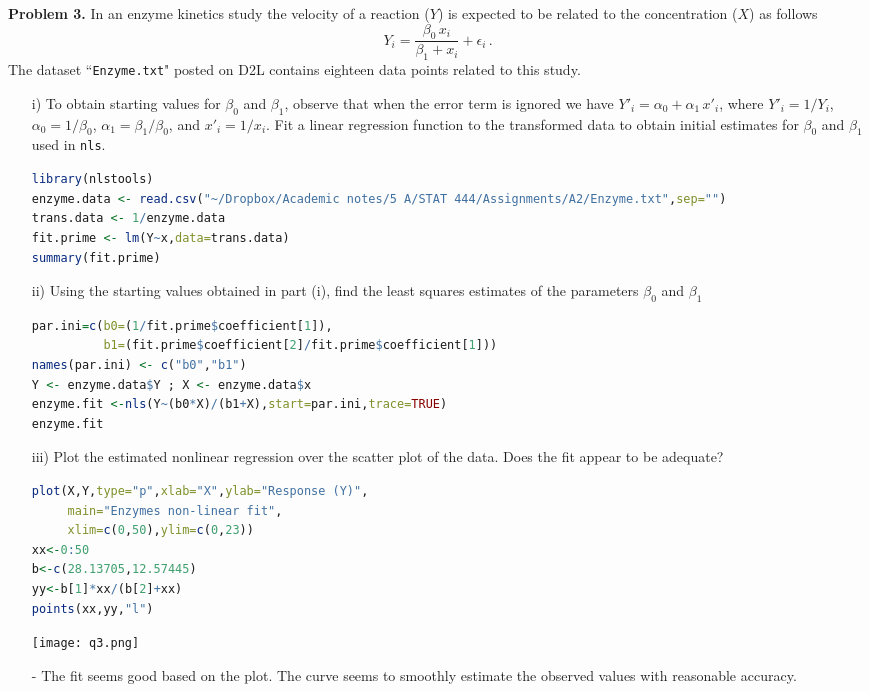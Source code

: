 \documentclass[11pt]{report}
\begin{document}
\newpage
\noindent 
{\bf Problem 3. } In an enzyme kinetics study the velocity of a reaction ($Y$) is expected to be related to the concentration ($X$) as follows  
$$Y_i=\frac{\beta_0 \,x_i}{\beta_1+x_i}+\epsilon_i\,.$$
The dataset ``{\tt Enzyme.txt}" posted on D2L contains eighteen data points related to this study. 
\begin{itemize}
\item[i) ] To obtain starting values for $\beta_0$ and $\beta_1$, observe that when the error term is ignored we have $Y'_i=\alpha_0+\alpha_1\,x'_i$, where $Y'_i=1/Y_i$, $\alpha_0=1/\beta_0$, $\alpha_1=\beta_1/\beta_0$, and $x'_i=1/x_i$. Fit a linear regression function to the transformed data to obtain initial estimates for $\beta_0$ and $\beta_1$ used in {\tt nls}. 

\begin{lstlisting}[language=R]
library(nlstools)
enzyme.data <- read.csv("~/Dropbox/Academic notes/5 A/STAT 444/Assignments/A2/Enzyme.txt",sep="")
trans.data <- 1/enzyme.data
fit.prime <- lm(Y~x,data=trans.data) 
summary(fit.prime)
\end{lstlisting}

\item[ii) ] Using the starting values obtained in part (i), find the least squares estimates of the parameters $\beta_0$ and $\beta_1$ 

\begin{lstlisting}[language=R]
par.ini=c(b0=(1/fit.prime$coefficient[1]), 
          b1=(fit.prime$coefficient[2]/fit.prime$coefficient[1]))
names(par.ini) <- c("b0","b1")
Y <- enzyme.data$Y ; X <- enzyme.data$x
enzyme.fit <-nls(Y~(b0*X)/(b1+X),start=par.ini,trace=TRUE)
enzyme.fit
\end{lstlisting}

\item[iii) ] Plot the estimated nonlinear regression over the scatter plot of the data. Does the fit appear to be adequate?

\begin{lstlisting}[language=R]
plot(X,Y,type="p",xlab="X",ylab="Response (Y)",
     main="Enzymes non-linear fit",
     xlim=c(0,50),ylim=c(0,23))
xx<-0:50
b<-c(28.13705,12.57445)
yy<-b[1]*xx/(b[2]+xx)
points(xx,yy,"l")
\end{lstlisting}

\texttt{[image: q3.png]}

\item[-] The fit seems good based on the plot. The curve seems to smoothly estimate the observed values with reasonable accuracy.


\end{itemize}
\end{document}

